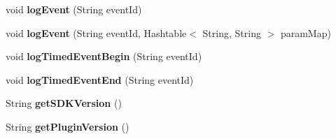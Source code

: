 \begin{DoxyCompactItemize}
void {\bfseries log\+Event} (String event\+Id)
\item 
\mbox{\label{classorg_1_1cocos2dx_1_1plugin_1_1AnalyticsFlurry_adf9b1636c3bdb11a5bd25859d0840fdb}} 
void {\bfseries log\+Event} (String event\+Id, Hashtable$<$ String, String $>$ param\+Map)
\item 
\mbox{\label{classorg_1_1cocos2dx_1_1plugin_1_1AnalyticsFlurry_afcebb2e9e99ca31128d46495b5b230fb}} 
void {\bfseries log\+Timed\+Event\+Begin} (String event\+Id)
\item 
\mbox{\label{classorg_1_1cocos2dx_1_1plugin_1_1AnalyticsFlurry_a2b67cff00a64f23c8a97416379d8d93d}} 
void {\bfseries log\+Timed\+Event\+End} (String event\+Id)
\item 
\mbox{\label{classorg_1_1cocos2dx_1_1plugin_1_1AnalyticsFlurry_a5fa2cac5049b4d74b8e1377636e87b4e}} 
String {\bfseries get\+S\+D\+K\+Version} ()
\item 
\mbox{\label{classorg_1_1cocos2dx_1_1plugin_1_1AnalyticsFlurry_ab35924e08fea7aa41bf8b942c3f78ee7}} 
String {\bfseries get\+Plugin\+Version} ()
\end{DoxyCompactItemize}
